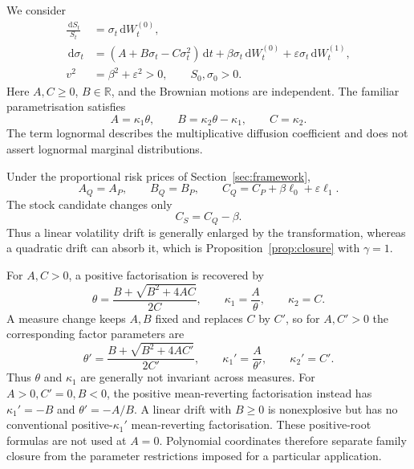 \documentclass[11pt,a4paper]{article}
\theoremstyle{definition}
\theoremstyle{remark}
\newcommand{\RR}{\mathbb{R}}
\newcommand{\dd}{\,\mathrm{d}}
\begin{document}
We consider
\begin{align}
 \frac{\dd S_t}{S_t}&=\sigma_t\dd W_t^{(0)},\label{eq:quad-price}\\
 \dd\sigma_t&=(A+B\sigma_t-C\sigma_t^2)\dd t+
       \beta\sigma_t\dd W_t^{(0)}
       +\varepsilon\sigma_t\dd W_t^{(1)},\label{eq:quad-vol}\\
 v^2&=\beta^2+\varepsilon^2>0,\qquad S_0,\sigma_0>0.\nonumber
\end{align}
Here \(A,C\geq0\), \(B\in\RR\), and the Brownian motions are independent.
The familiar parametrisation satisfies
\begin{equation}
 A=\kappa_1\theta,\qquad B=\kappa_2\theta-\kappa_1,\qquad C=\kappa_2.
 \label{eq:polynomial-map}
\end{equation}
The term lognormal describes the multiplicative diffusion coefficient and does not assert lognormal marginal distributions.

Under the proportional risk prices of Section~\ref{sec:framework},
\begin{equation}
 A_Q=A_P,\qquad B_Q=B_P,\qquad
 C_Q=C_P+\beta\ell_0+\varepsilon\ell_1.
 \label{eq:pq-map}
\end{equation}
The stock candidate changes only
\begin{equation}
 C_S=C_Q-\beta.
 \label{eq:qs-map}
\end{equation}
Thus a linear volatility drift is generally enlarged by the transformation, whereas a quadratic drift can absorb it, which is Proposition~\ref{prop:closure} with \(\gamma=1\).

For \(A,C>0\), a positive factorisation is recovered by
\[
 \theta=\frac{B+\sqrt{B^2+4AC}}{2C},\qquad
 \kappa_1=\frac{A}{\theta},\qquad \kappa_2=C.
\]
A measure change keeps \(A,B\) fixed and replaces \(C\) by \(C'\), so for \(A,C'>0\) the corresponding factor parameters are
\begin{equation}
 \theta'=\frac{B+\sqrt{B^2+4AC'}}{2C'},\qquad
 \kappa_1'=\frac{A}{\theta'},\qquad \kappa_2'=C'.
 \label{eq:factor-measure-map}
\end{equation}
Thus \(\theta\) and \(\kappa_1\) are generally not invariant across measures. For \(A>0,C'=0,B<0\), the positive mean-reverting factorisation instead has \(\kappa_1'=-B\) and \(\theta'=-A/B\). A linear drift with \(B\geq0\) is nonexplosive but has no conventional positive-\(\kappa_1'\) mean-reverting factorisation. These positive-root formulas are not used at \(A=0\). Polynomial coordinates therefore separate family closure from the parameter restrictions imposed for a particular application.
\end{document}

